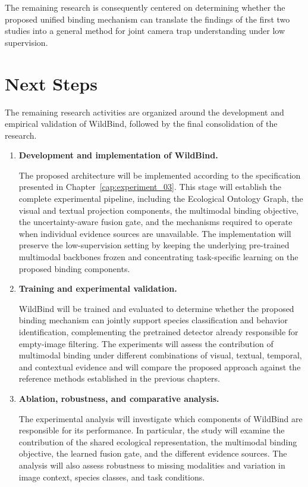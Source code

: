 The remaining research is consequently centered on determining whether the proposed unified binding mechanism can translate the findings of the first two studies into a general method for joint camera trap understanding under low supervision.

\section{Next Steps}\label{sec:next_steps}

The remaining research activities are organized around the development and empirical validation of WildBind, followed by the final consolidation of the research.

\begin{enumerate}

\item \textbf{Development and implementation of WildBind.}

The proposed architecture will be implemented according to the specification presented in Chapter~\ref{cap:experiment_03}. This stage will establish the complete experimental pipeline, including the Ecological Ontology Graph, the visual and textual projection components, the multimodal binding objective, the uncertainty-aware fusion gate, and the mechanisms required to operate when individual evidence sources are unavailable. The implementation will preserve the low-supervision setting by keeping the underlying pre-trained multimodal backbones frozen and concentrating task-specific learning on the proposed binding components.

\item \textbf{Training and experimental validation.}

WildBind will be trained and evaluated to determine whether the proposed binding mechanism can jointly support species classification and behavior identification, complementing the pretrained detector already responsible for empty-image filtering. The experiments will assess the contribution of multimodal binding under different combinations of visual, textual, temporal, and contextual evidence and will compare the proposed approach against the reference methods established in the previous chapters.

\item \textbf{Ablation, robustness, and comparative analysis.}

The experimental analysis will investigate which components of WildBind are responsible for its performance. In particular, the study will examine the contribution of the shared ecological representation, the multimodal binding objective, the learned fusion gate, and the different evidence sources. The analysis will also assess robustness to missing modalities and variation in image context, species classes, and task conditions.


\end{enumerate}
